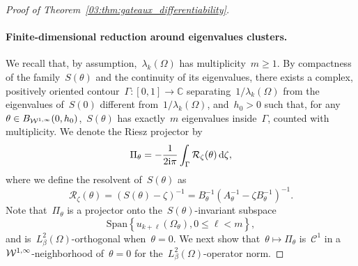 \begin{proof}[Proof of Theorem~\ref{03:thm:gateaux_differentiability}]
    \paragraph{Finite-dimensional reduction around eigenvalues clusters.}
    We recall that, by assumption,~$\lambda_k(\Omega)$ has multiplicity~$m\geq 1$.
    By compactness of the family~$S(\theta)$ and the continuity of its eigenvalues, there exists a complex, positively oriented contour~$\Gamma:[0,1]\to \mathbb C$ separating~$1/\lambda_k(\Omega)$ from the eigenvalues of~$S(0)$ different from~$1/\lambda_k(\Omega)$, and~$h_0>0$ such that, for any~$\theta\in B_{{\mathcal{W}}^{1,\infty}}(0,h_0)$,~$S(\theta)$ has exactly~$m$ eigenvalues inside~$\Gamma$, counted with multiplicity.
    We denote the Riesz projector by
    \begin{equation}
        \label{03:eq:spectral_projector}
        \Pi_\theta = -\frac1{2{\mathrm{i}}\pi}\int_{\Gamma} \mathcal R_{\zeta}(\theta)\,\mathrm{d}\zeta,
    \end{equation}
     where we define the resolvent of~$S(\theta)$ as
    \begin{equation}
        \label{03:eq:resolvent}
        \mathcal R_\zeta(\theta) = \left(S(\theta) - \zeta\right)^{-1} = B_\theta^{-1}(A_\theta^{-1}-\zeta B_\theta^{-1})^{-1}.
    \end{equation}
    Note that~$\Pi_\theta$ is a projector onto the~$S(\theta)$-invariant subspace
    $$\mathrm{Span}\left\{u_{k+\ell}(\Omega_\theta),0\leq \ell < m\right\},$$
    and is~$L^2_\beta(\Omega)$-orthogonal when~$\theta=0$.
    We next show that~$\theta\mapsto\Pi_\theta$ is~$\mathcal C^1$ in a~${\mathcal{W}}^{1,\infty}$-neighborhood of~$\theta=0$ for the~$L^2_\beta(\Omega)$-operator norm.


\end{proof}
